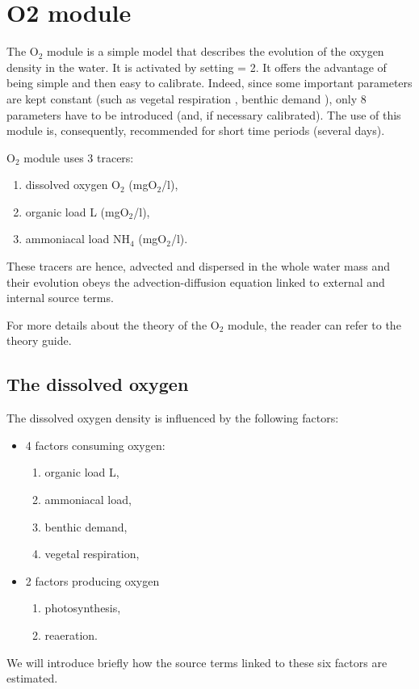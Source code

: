 \chapter{O2 module}
\label{subs:O2:mod}

The O$_2$ module is a simple model that describes the evolution of the oxygen density in the water.
It is activated by setting  = 2.
It offers the advantage of being simple and then easy to calibrate.
Indeed, since some important parameters are kept constant
(such as vegetal respiration ,
benthic demand ),
only 8 parameters have to be introduced (and, if necessary calibrated).
The use of this module is, consequently, recommended for short time periods (several days).

O$_2$ module uses 3 tracers:

\begin{enumerate}
\item dissolved oxygen O$_2$ (mgO$_2$/l),
\item organic load L (mgO$_2$/l),
\item ammoniacal load NH$_4$ (mgO$_2$/l).
\end{enumerate}

These tracers are hence, advected and dispersed in the whole water mass
and their evolution obeys the advection-diffusion equation linked to external and internal source terms.

For more details about the theory of the O$_2$ module,
the reader can refer to the \waqtel theory guide.


\section{The dissolved oxygen}

The dissolved oxygen density is influenced by the following factors:

\begin{itemize}
\item 4 factors consuming oxygen:

\begin{enumerate}
\item organic load L,
\item ammoniacal load,
\item benthic demand,
\item vegetal respiration,
\end{enumerate}

\item 2 factors producing oxygen
\begin{enumerate}
\item photosynthesis,

\item reaeration.
\end{enumerate}
\end{itemize}
We will introduce briefly how the source terms linked to these six factors are estimated.



